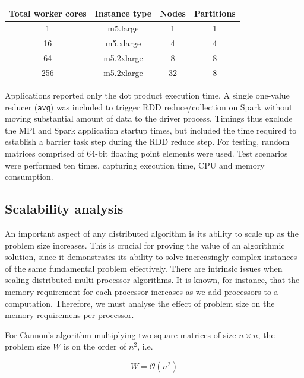 \documentclass[fleqn,10pt]{SelfArx} %
\begin{document}
\begin{center}
	\begin{tabular}{ |c|c|c|c| } 
	 \hline
	 Total worker cores & Instance type & Nodes & Partitions  \\ 
	 \hline\hline
	 1 & m5.large & 1 & 1 \\ 
	 \hline
	 16 & m5.xlarge & 4 & 4 \\ 
	 \hline
	 64 & m5.2xlarge & 8 & 8 \\ 
	 \hline
	 256 & m5.2xlarge & 32 & 8 \\ 
	 \hline
	\end{tabular}
\end{center}
	

Applications reported only the dot product execution time. A single one-value reducer (\texttt{avg}) was included to trigger RDD reduce/collection on Spark without moving substantial amount of data to the driver process. Timings thus exclude the MPI and Spark application startup times, but included the time required to establish a barrier task step during the RDD reduce step. For testing, random matrices comprised of 64-bit floating point elements were used. Test scenarios were performed ten times, capturing execution time, CPU and memory consumption.


\subsection{Scalability analysis} %
\label{sub:scalability_analysis}


An important aspect of any distributed algorithm is its ability to scale up as the problem size increases. This is crucial for proving the value of an algorithmic solution, since it demonstrates its ability to solve increasingly complex instances of the same fundamental problem effectively. There are intrinsic issues when scaling distributed multi-processor algorithms. It is known, for instance, that the memory requirement for each processor increases as we add processors to a computation. Therefore, we must analyse the effect of problem size on the memory requiremens per processor. 

For Cannon's algorithm multiplying two square matrices of size $n \times n$, the problem size $W$ is on the order of $n^2$, i.e.

\begin{equation}
	W = \mathcal{O}(n^2)
	\label{eq:problem_size}
\end{equation}
\end{document}
